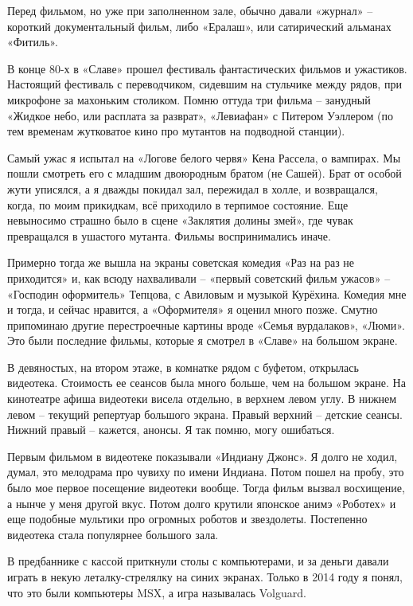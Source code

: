 Перед фильмом, но уже при заполненном зале, обычно давали «журнал» –  короткий документальный фильм, либо «Ералаш», или сатирический альманах «Фитиль».

В конце 80-х в «Славе» прошел фестиваль фантастических фильмов и ужастиков. Настоящий фестиваль с переводчиком, сидевшим на стульчике между рядов, при микрофоне за махоньким столиком. Помню оттуда три фильма – занудный «Жидкое небо, или расплата за разврат», «Левиафан» с Питером Уэллером (по тем временам жутковатое кино про мутантов на подводной станции). 

Самый ужас я испытал на «Логове белого червя» Кена Рассела, о вампирах. Мы пошли смотреть его с младшим двоюродным братом (не Сашей). Брат от особой жути уписялся, а я дважды покидал зал, пережидал в холле, и возвращался, когда, по моим прикидкам, всё приходило в терпимое состояние. Еще невыносимо страшно было в сцене «Заклятия долины змей», где чувак превращался в ушастого мутанта. Фильмы воспринимались иначе.

Примерно тогда же вышла на экраны советская комедия «Раз на раз не приходится» и, как всюду нахваливали – «первый советский фильм ужасов» – «Господин оформитель» Тепцова, с Авиловым и музыкой Курёхина. Комедия мне и тогда, и сейчас нравится, а «Оформителя» я оценил много позже. Смутно припоминаю другие перестроечные картины вроде «Семья вурдалаков», «Люми». Это были последние фильмы, которые я смотрел в «Славе» на большом экране.

В девяностых, на втором этаже, в комнатке рядом с буфетом, открылась видеотека. Стоимость ее сеансов была много больше, чем на большом экране. На кинотеатре афиша видеотеки висела отдельно, в верхнем левом углу. В нижнем левом – текущий репертуар большого экрана. Правый верхний – детские сеансы. Нижний правый – кажется, анонсы. Я так помню, могу ошибаться.

Первым фильмом в видеотеке показывали «Индиану Джонс». Я долго не ходил, думал, это мелодрама про чувиху по имени Индиана. Потом пошел на пробу, это было мое первое посещение видеотеки вообще. Тогда фильм вызвал восхищение, а нынче у меня другой вкус. Потом долго крутили японское анимэ «Роботех» и еще подобные мультики про огромных роботов и звездолеты. Постепенно видеотека стала популярнее большого зала.

В предбаннике с кассой приткнули столы с компьютерами, и за деньги давали играть в некую леталку-стрелялку на синих экранах. Только в 2014 году я понял, что это были компьютеры MSX, а игра называлась Volguard.

